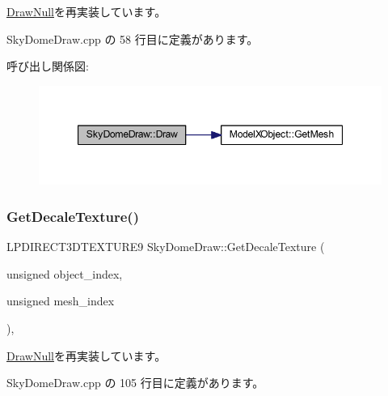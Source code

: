 \mbox{\hyperlink{class_draw_null_afe50f6fd820b18d673f70f048743f339}{Draw\+Null}}を再実装しています。



 Sky\+Dome\+Draw.\+cpp の 58 行目に定義があります。

呼び出し関係図\+:\nopagebreak
\begin{figure}[H]
\begin{center}
\leavevmode
\includegraphics[width=347pt]{class_sky_dome_draw_a42364ea42618cbab588d55050edfe95a_cgraph}
\end{center}
\end{figure}
\mbox{\label{class_sky_dome_draw_a1d708782f13648724e423d1dca22b213}} 
\subsubsection{\texorpdfstring{Get\+Decale\+Texture()}{GetDecaleTexture()}}
{\footnotesize\ttfamily L\+P\+D\+I\+R\+E\+C\+T3\+D\+T\+E\+X\+T\+U\+R\+E9 Sky\+Dome\+Draw\+::\+Get\+Decale\+Texture (\begin{DoxyParamCaption}\item[{unsigned}]{object\+\_\+index,  }\item[{unsigned}]{mesh\+\_\+index }\end{DoxyParamCaption})\hspace{0.3cm}{\ttfamily [override]}, {\ttfamily [virtual]}}



\mbox{\hyperlink{class_draw_null_a8496ed1b1f765a331a8f1704122b8ca4}{Draw\+Null}}を再実装しています。



 Sky\+Dome\+Draw.\+cpp の 105 行目に定義があります。

